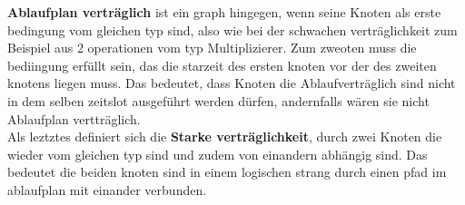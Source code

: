 \documentclass[conference]{IEEEtran}
\begin{document}
\textbf{Ablaufplan verträglich} ist ein graph hingegen, wenn seine Knoten als erste bedingung vom gleichen typ sind, also wie bei der schwachen verträglichkeit zum Beispiel aus 2 operationen vom typ Multiplizierer. Zum zweoten muss die bediingung erfüllt sein, das die starzeit des ersten knoten vor der des zweiten knotens liegen muss. Das bedeutet, dass Knoten die Ablaufverträglich sind nicht in dem selben zeitslot ausgeführt werden dürfen, andernfalls wären sie nicht Ablaufplan vertträglich\cite{?}.\\

Als leztztes definiert sich die \textbf{Starke verträglichkeit}, durch zwei Knoten die wieder vom gleichen typ sind und zudem von einandern abhängig sind. Das bedeutet die beiden knoten sind in einem logischen strang durch einen pfad im ablaufplan mit einander verbunden.\cite{?}
\end{document}
